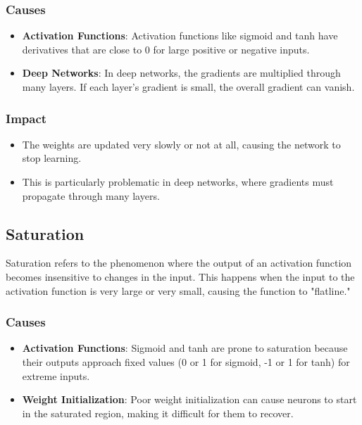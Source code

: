 \begin{notechapter}
\subsubsection{Causes}
\begin{itemize}[leftmargin=*]
    \item \textbf{Activation Functions}: Activation functions like sigmoid and tanh
    have derivatives that are close to 0 for large positive or negative inputs.
    \item \textbf{Deep Networks}: In deep networks, the gradients are multiplied
    through many layers. If each layer's gradient is small, the overall gradient
    can vanish.
\end{itemize}

\subsubsection{Impact}
\begin{itemize}[leftmargin=*]
    \item The weights are updated very slowly or not at all, causing the network
    to stop learning.
    \item This is particularly problematic in deep networks, where gradients must
    propagate through many layers.
\end{itemize}

\subsection{Saturation}
Saturation refers to the phenomenon where the output of an activation function
becomes insensitive to changes in the input. This happens when the input to the
activation function is very large or very small, causing the function to "flatline."

\subsubsection{Causes}
\begin{itemize}[leftmargin=*]
    \item \textbf{Activation Functions}: Sigmoid and tanh are prone to saturation
    because their outputs approach fixed values (0 or 1 for sigmoid, -1 or 1 for
    tanh) for extreme inputs.
    \item \textbf{Weight Initialization}: Poor weight initialization can cause
    neurons to start in the saturated region, making it difficult for them to
    recover.
\end{itemize}


\end{notechapter}
